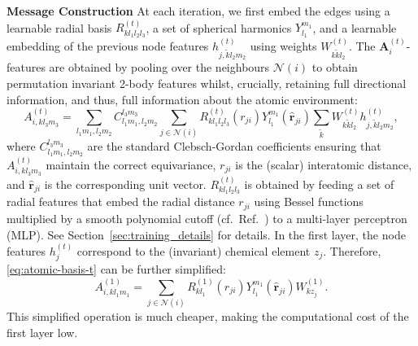 \documentclass{article}
\def\kk{k}
\newcommand*\compactparagraph[1]{\textbf{#1} \quad}
\begin{document}
\compactparagraph{Message Construction}
At each iteration, we first embed the edges using a learnable radial basis $ R_{\kk l_{1}l_{2} l_{3}}^{(t)}$,
a set of spherical harmonics $Y^{m_{1}}_{l_{1}}$,
and a learnable embedding of the previous node features $h^{(t)}_{j,\tilde{k}l_2m_2}$ using weights $W^{(t)}_{\kk\tilde{k} l_{2}}$.
The $\bm{A}_{i}^{(t)}$-features are obtained by pooling over the neighbours $\mathcal{N}(i)$ to obtain permutation invariant 2-body features whilst, crucially, retaining full directional information, and thus, full information about the atomic environment:
%
\begin{equation}
  \label{eq:atomic-basis-t}
  A_{i,\kk l_{3}m_{3}}^{(t)} =
  \sum_{l_{1}m_{1}, l_{2}m_{2}}C^{l_{3}m_{3}}_{l_{1}m_{1},l_{2}m_{2}}
  \sum_{j \in \mathcal{N}(i) } R_{\kk l_{1}l_{2} l_{3}}^{(t)}(r_{ji})
  Y^{m_{1}}_{l_{1}} (\boldsymbol{\hat{r}}_{ji}) \sum_{\tilde{k}} W^{(t)}_{\kk\tilde{k} l_{2}} h^{(t)}_{j,\tilde{k}l_2m_2},
\end{equation}
%
where $C^{l_{3}m_{3}}_{l_{1}m_{1},l_{2}m_{2}}$ are the standard Clebsch-Gordan coefficients ensuring that $A_{i,\kk l_{3}m_{3}}^{(t)}$ maintain the correct equivariance,
$r_{ji}$ is the (scalar) interatomic distance,
and $\hat{\boldsymbol{r}}_{ji}$ is the corresponding unit vector.
$R_{\kk l_{1}l_{2} l_{3}}^{(t)}$ is obtained by feeding a set of radial features that embed the radial distance $r_{ji}$ using Bessel functions multiplied by a smooth polynomial cutoff (cf.\ Ref.~\cite{DimeNet}) to a multi-layer perceptron (MLP).
See Section~\ref{sec:training_details} for details.
In the first layer, the node features $h_{j}^{(t)}$ correspond to the (invariant) chemical element $z_{j}$.
Therefore, \eqref{eq:atomic-basis-t} can be further simplified:
%
\begin{equation}
  \label{eq:atomic-basis-1}
  A_{i,\kk l_{1}m_{1}}^{(1)} = \sum_{j \in \mathcal{N}(i)} R^{(1)}_{\kk l_{1}}(r_{ji}) Y^{m_{1}}_{l_{1}}(\hat{\boldsymbol{r}}_{ji})
  W^{(1)}_{k z_{j}}.
\end{equation}
%
This simplified operation is much cheaper, making the computational cost of the first layer low.
\end{document}
